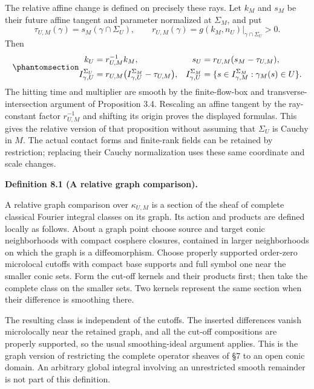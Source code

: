 \documentclass[
  english,
  11pt,
  reqno]{amsart}
\makeatletter
\newcommand{\pandocstatementheading}[1]{%
  \par\if@nobreak\else
    \addpenalty{\@beginparpenalty}%
    \addvspace{.5\baselineskip plus .2\baselineskip minus .2\baselineskip}%
  \fi
  {\normalfont\bfseries #1\par}%
  \nobreak\@afterindenttrue\@afterheading
}
\makeatother
\begin{document}
The relative affine change is defined on precisely these rays. Let
\(k_M\) and \(s_M\) be their future affine tangent and parameter
normalized at \(\Sigma_M\), and put \[
\tau_{U,M}(\gamma)=s_M(\gamma\cap\Sigma_U),
\qquad
r_{U,M}(\gamma)=g(k_M,n_U)|_{\gamma\cap\Sigma_U}>0.
\] Then
\begin{equation}\protect\phantomsection\label{eq:relative-affine-normalization}{
\begin{aligned}
k_U&=r_{U,M}^{-1}k_M,
&s_U&=r_{U,M}(s_M-\tau_{U,M}),\\
I_{\gamma,U}^{\Sigma_U}
&=r_{U,M}\bigl(I_{\gamma,U}^{\Sigma_M}-\tau_{U,M}\bigr),
&I_{\gamma,U}^{\Sigma_M}
&=\{s\in I_{\gamma,M}^{\Sigma_M}:\gamma_M(s)\in U\}.
\end{aligned}
}\end{equation} The hitting time and multiplier are smooth by the
finite-flow-box and transverse-intersection argument of Proposition 3.4.
Rescaling an affine tangent by the ray-constant factor \(r_{U,M}^{-1}\)
and shifting its origin proves the displayed formulas. This gives the
relative version of that proposition without assuming that \(\Sigma_U\)
is Cauchy in \(M\). The actual contact forms and finite-rank fields can
be retained by restriction; replacing their Cauchy normalization uses
these same coordinate and scale changes.

\pandocstatementheading{\protect{}\label{def:relative-graph-comparison}Definition 8.1 (A relative graph comparison).}

A relative graph comparison over \(\kappa_{U,M}\) is a section of the
sheaf of complete classical Fourier integral classes on its graph. Its
action and products are defined locally as follows. About a graph point
choose source and target conic neighborhoods with compact cosphere
closures, contained in larger neighborhoods on which the graph is a
diffeomorphism. Choose properly supported order-zero microlocal cutoffs
with compact base supports and full symbol one near the smaller conic
sets. Form the cut-off kernels and their products first; then take the
complete class on the smaller sets. Two kernels represent the same
section when their difference is smoothing there.

The resulting class is independent of the cutoffs. The inserted
differences vanish microlocally near the retained graph, and all the
cut-off compositions are properly supported, so the usual
smoothing-ideal argument applies. This is the graph version of
restricting the complete operator sheaves of §7 to an open conic domain.
An arbitrary global integral involving an unrestricted smooth remainder
is not part of this definition.
\end{document}
